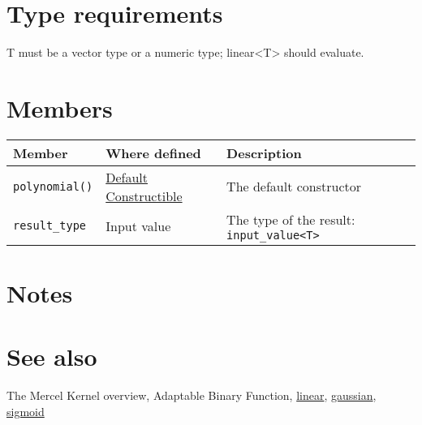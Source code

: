 \documentclass{article}
\begin{document}
\section*{Type requirements}

T must be a vector type or a numeric type; linear<T> should evaluate.


\section*{Members}

\begin{tabular}{lll}
\textbf{Member} & \textbf{Where defined} & \textbf{Description} \\ 
\hline
\texttt{polynomial()} & \href{http://www.sgi.com/tech/stl/DefaultConstructible.html}{Default Constructible} & The default constructor \\
\texttt{result_type} & Input value & The type of the result: \texttt{input_value<T>} \\
\end{tabular}

\section*{Notes}

\section*{See also}

The Mercel Kernel overview, Adaptable Binary Function,
\href{\kmlroot/linear.html}{linear}, 
\href{\kmlroot/gaussian.html}{gaussian}, 
\href{\kmlroot/sigmoid.html}{sigmoid}




\end{document}
